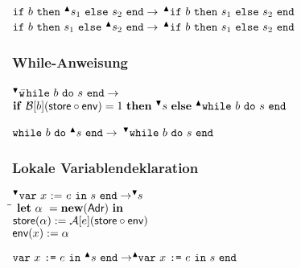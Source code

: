 \documentclass[german,10pt, a4paper, twocolumn]{scrartcl}
\theoremstyle{definition}
\theoremstyle{remark}
\begin{document}
$\mbox{\tt if}\ b\ \mbox{\tt then}\ ^{\blacktriangle}s_1\ \mbox{\tt else}\ s_2\ \mbox{\tt end} \rightarrow$
$^{\blacktriangle} \mbox{\tt if}\ b\ \mbox{\tt then}\ s_1\ \mbox{\tt else}\ s_2\ \mbox{\tt end}$\\

$\mbox{\tt if}\ b\ \mbox{\tt then}\ s_1\ \mbox{\tt else}\ ^{\blacktriangle} s_2\ \mbox{\tt end} \rightarrow$
$^{\blacktriangle} \mbox{\tt if}\ b\ \mbox{\tt then}\ s_1\ \mbox{\tt else}\ s_2\ \mbox{\tt end}$
\normalsize

\subsubsection{While-Anweisung}

\small
\begin{tabbing}
 $^{\blacktriangledown} \mbox{\tt w}$\=$\mbox{\tt hile}\ b\ \mbox{\tt do}\ s\ \mbox{\tt end} \rightarrow$\\
 \>	$\mbox{\textbf{if}}\ \mathcal{B}[b](\mbox{\sffamily store}\circ\mbox{\sffamily env}) = 1\ \mbox{\textbf{then}}\ ^{\blacktriangledown} s\ \mbox{\textbf{else}}\ ^{\blacktriangle} \mbox{\tt while}\ b\ \mbox{\tt do}\ s\ \mbox{\tt end}$
\end{tabbing}

$\mbox{\tt while}\ b\ \mbox{\tt do}\ ^{\blacktriangle}s\ \mbox{\tt end} \rightarrow$
$^{\blacktriangledown} \mbox{\tt while}\ b\ \mbox{\tt do}\ s\ \mbox{\tt end}$
\normalsize

\subsubsection{Lokale Variablendeklaration}
\small
\begin{tabbing}
  $^{\blacktriangledown}\mbox{\tt var}\ x\ \mbox{:=}\ e\ \mbox{\tt in}\ s\ \mbox{\tt end} \rightarrow ^{\blacktriangledown}\!\!s$\\
  \qquad \= \quad \= \kill
  \>	$\mbox{\textbf{let}}\ \alpha\ = \mbox{\textbf{new}}(\mbox{\sffamily Adr})\ \mbox{\textbf{in}}$\\
  \> \>		$\mbox{\sffamily store}(\alpha):= \mathcal{A}[e](\mbox{\sffamily store} \circ \mbox{\sffamily env})$\\
  \> \>		$\mbox{\sffamily env}(x) := \alpha$
\end{tabbing}

$\mbox{\tt var}\ x\ \mbox{\tt :=}\ e\ \mbox{\tt in}\ ^{\blacktriangle} s\ \mbox{\tt end} \rightarrow ^{\blacktriangle}\!\!\mbox{\tt var}\ x\ \mbox{\tt :=}\ e\ \mbox{\tt in}\ s\ \mbox{\tt end}$
\normalsize
\end{document}
